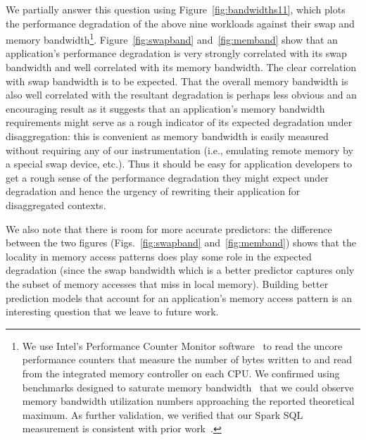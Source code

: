 We partially answer this question using Figure~\ref{fig:bandwidths11}, which plots the performance degradation of the above nine workloads against their swap and memory bandwidth{\footnote{We use Intel's Performance Counter Monitor software~\cite{intel-mem-count} to read the uncore performance counters that measure the number of bytes written to and read from the integrated memory controller on each CPU. We confirmed using benchmarks designed to saturate memory bandwidth~\cite{mem-band-bench} that we could observe memory bandwidth utilization numbers approaching the reported theoretical maximum. As further validation, we verified that our Spark SQL measurement is consistent with prior work~\cite{georgeporter}.}}. Figure~\ref{fig:swapband} and~\ref{fig:memband} show that an application's performance degradation is very strongly correlated with its swap bandwidth and well correlated with its memory bandwidth. The clear correlation with swap bandwidth is to be expected. That the overall memory bandwidth is also well correlated with the resultant degradation is perhaps less obvious and an encouraging result as it suggests that an application's memory bandwidth requirements might serve as a rough indicator of its expected degradation under disaggregation: this is convenient as memory bandwidth is easily measured without requiring any of our instrumentation (i.e., emulating remote memory by a special swap device, etc.). Thus it should be easy for application developers to get a rough sense of the performance degradation they might expect under degradation and hence the urgency of rewriting their application for disaggregated contexts.

We also note that there is room for more accurate predictors: the difference between the two figures (Figs.~\ref{fig:swapband} and~\ref{fig:memband}) shows that the locality in memory access patterns does play some role in the expected degradation (since the swap bandwidth which is a better predictor captures only the subset of memory accesses that miss in local memory). Building better prediction models that account for an application's memory access pattern is an interesting question that we leave to future work. 







